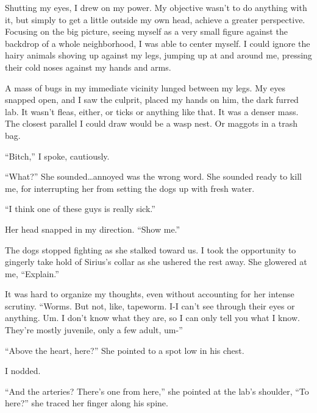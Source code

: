 Shutting my eyes, I drew on my power.  My objective wasn't to do anything with it, but simply to get a little outside my own head, achieve a greater perspective.  Focusing on the big picture, seeing myself as a very small figure against the backdrop of a whole neighborhood, I was able to center myself.  I could ignore the hairy animals shoving up against my legs, jumping up at and around me, pressing their cold noses against my hands and arms.



A mass of bugs in my immediate vicinity lunged between my legs.  My eyes snapped open, and I saw the culprit, placed my hands on him, the dark furred lab.  It wasn't fleas, either, or ticks or anything like that.  It was a denser mass.  The closest parallel I could draw would be a wasp nest.  Or maggots in a trash bag.



``Bitch,'' I spoke, cautiously.



``What?'' She sounded\ldots annoyed was the wrong word.  She sounded ready to kill me, for interrupting her from setting the dogs up with fresh water.



``I think one of these guys is really sick.''



Her head snapped in my direction.  ``Show me.''



The dogs stopped fighting as she stalked toward us.  I took the opportunity to gingerly take hold of Sirius's collar as she ushered the rest away.  She glowered at me, ``Explain.''



It was hard to organize my thoughts, even without accounting for her intense scrutiny.  ``Worms.  But not, like, tapeworm.  I-I can't see through their eyes or anything.  Um.  I don't know what they are, so I can only tell you what I know.  They're mostly juvenile, only a few adult, um-''



``Above the heart, here?''  She pointed to a spot low in his chest.



I nodded.



``And the arteries?  There's one from here,'' she pointed at the lab's shoulder, ``To here?'' she traced her finger along his spine.



